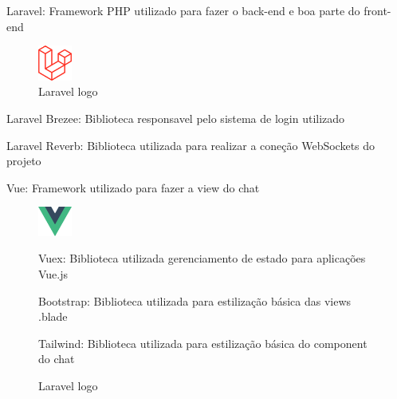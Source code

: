 \begin{itemize}
    \item Laravel: Framework PHP utilizado para fazer o back-end e boa parte do front-end
    \begin{figure}[h!] 
    \centering
    \includegraphics[width=0.1\textwidth, height=0.1\textheight]{./img/laravel-logo-41EC1D4C3F-seeklogo.com.png}
    \caption{Laravel logo}
    \label{fig:exemplo-imagem}
\end{figure}
    \newpage
    \item Laravel Brezee: Biblioteca responsavel pelo sistema de login utilizado
    \item Laravel Reverb: Biblioteca utilizada para realizar a coneção WebSockets do projeto 

    \item Vue: Framework utilizado para fazer a view do chat
    \begin{figure}[h!] 
    \centering
    \includegraphics[width=0.1\textwidth, height=0.1\textheight]{./img/vuejs-logo-17D586B587-seeklogo.com.png}
    \caption{Laravel logo}
    \label{fig:exemplo-imagem}
    \item Vuex: Biblioteca utilizada gerenciamento de estado para aplicações Vue.js
    \item Bootstrap: Biblioteca utilizada para estilização básica das views .blade
    \item Tailwind: Biblioteca utilizada para estilização básica do component do chat
\end{figure}





\end{itemize}


